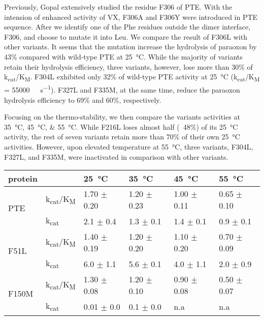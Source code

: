 \begin{refsection}
Previously, Gopal  extensively studied the residue F306 of
PTE.\cite{Gopal2000} With the intension of enhanced activity of VX, F306A and
F306Y were introduced in PTE sequence. After we identify one of the Phe
residues outside the dimer interface, F306,  and choose to mutate it into Leu.
We compare the result of F306L with other variants. It seems that the mutation
increase the hydrolysis of paraoxon by 43\% compared with wild-type PTE at
\SI{25}{\celsius}. While the majority of variants retain their hydrolysis
efficiency, three variants, however, lose more than 30\% of
k\textsubscript{cat}/K\textsubscript{M}. F304L exhibited only 32\% of wild-type
PTE activity at \SI{25}{\celsius} (k\textsubscript{cat}/K\textsubscript{M} =
\SI{55000}{\per\Molar\per\second}). F327L and F335M, at the same time, reduce
the paraoxon hydrolysis efficiency to 69\% and 60\%, respectively.

Focusing on the thermo-stability, we then compare the variants activities at
\SIlist{35;45;55}{\celsius}. While F216L loses almost half (~48\%) of its
\SI{25}{\celsius} activity, the rest of seven variants retain more than 70\% of
their own \SI{25}{\celsius} activities. However, upon elevated temperature at
\SI{55}{\celsius}, three variants, F304L, F327L, and F335M, were inactivated in
comparison with other variants.

\begin{table}[h!]
    \centering
    \begin{tabular}{llllll}
        \hline%
        protein                 &  & \SI{25}{\celsius} & \SI{35}{\celsius} &
    \SI{45}{\celsius} & \SI{55}{\celsius} \\%
    
    \hline%
    
    \multirow{2}{*}{PTE}    & k\textsubscript{cat}/K\textsubscript{M} & 1.70 $
    \pm$ 0.20 & 1.20 $\pm$ 0.23 & 1.00 $\pm$ 0.11 & 0.65 $\pm$ 0.10 \\
    & k\textsubscript{cat} & 2.1 $\pm$ 0.4 & 1.3 $\pm$ 0.1 & 1.4 $\pm$ 0.1 & 0.9
    $\pm$ 0.1 \\%
    
    \multirow{2}{*}{F51L}  & k\textsubscript{cat}/K\textsubscript{M} & 1.40
    $\pm$ 0.19 & 1.20 $\pm$ 0.20 & 1.10 $\pm$ 0.20 & 0.70 $\pm$ 0.09 \\
    & k\textsubscript{cat} & 6.0 $\pm$ 1.1 & 5.6 $\pm$ 0.1 & 4.0 $\pm$ 1.1 &
    2.0 $\pm$ 0.9 \\%
    
    \multirow{2}{*}{F150M} & k\textsubscript{cat}/K\textsubscript{M} &
    1.30 $\pm$ 0.08 & 1.20 $\pm$ 0.10 & 0.90 $\pm$ 0.08 & 0.50 $\pm$ 0.07 \\
    & k\textsubscript{cat} & 0.01 $\pm$ 0.0 & 0.1 $\pm$ 0.0 & n.a & n.a \\%
    

\end{tabular}
\end{table}
\end{refsection}
